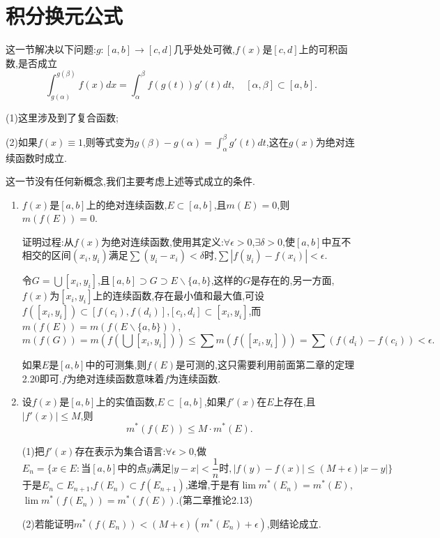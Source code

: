 \documentclass[12pt,a4paper,openany]{book}
\begin{document}
\section{积分换元公式}
这一节解决以下问题:$g:[a,b]\rightarrow[c,d]$几乎处处可微,$f(x)$是$[c,d]$上的可积函数,是否成立
\[
\int_{g(\alpha)}^{g(\beta)}{f(x)dx} = \int_{\alpha}^{\beta}{f(g(t))g'(t)dt},\quad [\alpha,\beta] \subset [a,b].
\]

(1)这里涉及到了复合函数;

(2)如果$f(x) \equiv 1$,则等式变为$g(\beta) - g(\alpha) = \int_{\alpha}^{\beta}{g'(t)dt}$,这在$g(x)$为绝对连续函数时成立.

这一节没有任何新概念,我们主要考虑上述等式成立的条件.

\begin{enumerate}
\item $f(x)$是$[a,b]$上的绝对连续函数,$E \subset [a,b]$,且$m(E)=0$,则$m(f(E))=0$.

证明过程:从$f(x)$为绝对连续函数,使用其定义:$\forall \epsilon>0$,$\exists \delta>0$,使$[a,b]$中互不相交的区间$(x_i,y_i)$满足$\sum{(y_i-x_i)}<\delta$时,$\sum{|f(y_i)-f(x_i)|}<\epsilon$.

令$G=\bigcup{[x_i,y_i]}$,且$[a,b] \supset G \supset E\backslash\{a,b\}$,这样的$G$是存在的,另一方面,$f(x)$为$[x_i,y_i]$上的连续函数,存在最小值和最大值,可设$f([x_i,y_i]) \subset [f(c_i),f(d_i)]$,$[c_i,d_i] \subset [x_i,y_i]$,而$m(f(E))=m(f(E \backslash \{a,b\}))$,
\[
m(f(G)) = m(f(\bigcup{[x_i,y_i]})) \le \sum{m(f([x_i,y_i]))} = \sum{(f(d_i) - f(c_i))}<\epsilon.
\]

如果$E$是$[a,b]$中的可测集,则$f(E)$是可测的,这只需要利用前面第二章的定理2.20即可.$f$为绝对连续函数意味着$f$为连续函数.

\item 设$f(x)$是$[a,b]$上的实值函数,$E \subset [a,b]$,如果$f'(x)$在$E$上存在,且$|f'(x)|\le M$,则
\[
m^*(f(E)) \le M \cdot m^*(E).
\]

(1)把$f'(x)$存在表示为集合语言:$\forall \epsilon>0$,做
\[
E_n=\{x \in E: \text{当}[a,b]\text{中的点}y\text{满足}|y-x|<\frac{1}{n}\text{时},|f(y)-f(x)|\le(M+\epsilon)|x-y|\}
\]
于是$E_n \subset E_{n+1}$,$f(E_n) \subset f(E_{n+1})$,递增,于是有$\lim{m^*(E_n)} = m^*(E)$,$\lim{m^*(f(E_n))}=m^*(f(E))$.(第二章推论2.13)

(2)若能证明$m^*(f(E_n))<(M+\epsilon)(m^*(E_n)+\epsilon)$,则结论成立.


\end{enumerate}
\end{document}
